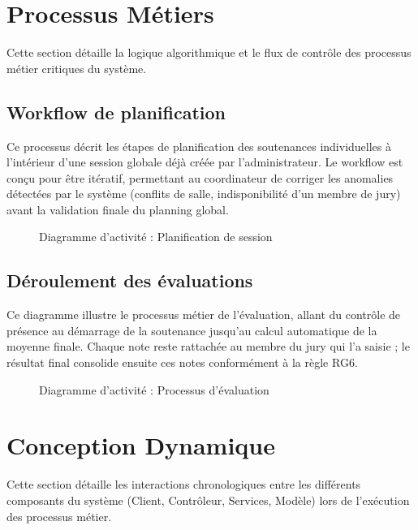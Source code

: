 \documentclass[12pt,a4paper]{article}
\begin{document}
\newpage
\section{Processus Métiers}
\label{sec:processus}

Cette section détaille la logique algorithmique et le flux de contrôle des processus métier critiques du système.

\subsection{Workflow de planification}
Ce processus décrit les étapes de planification des soutenances individuelles à
l'intérieur d'une session globale déjà créée par l'administrateur. Le workflow
est conçu pour être itératif, permettant au coordinateur de corriger les
anomalies détectées par le système (conflits de salle, indisponibilité d'un
membre de jury) avant la validation finale du planning global.

\begin{figure}[H]
    \centering
    \caption{Diagramme d'activité : Planification de session}
\end{figure}

\subsection{Déroulement des évaluations}
Ce diagramme illustre le processus métier de l'évaluation, allant du contrôle de
présence au démarrage de la soutenance jusqu'au calcul automatique de la moyenne
finale. Chaque note reste rattachée au membre du jury qui l'a saisie ; le
résultat final consolide ensuite ces notes conformément à la règle RG6.

\begin{figure}[H]
    \centering
    \caption{Diagramme d'activité : Processus d'évaluation}
\end{figure}

\newpage
\section{Conception Dynamique}
\label{sec:dynamique}

Cette section détaille les interactions chronologiques entre les différents composants du système (Client, Contrôleur, Services, Modèle) lors de l'exécution des processus métier.
\end{document}
